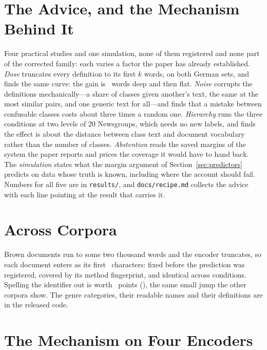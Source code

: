 \documentclass[11pt]{article}
\begin{document}


\section{The Advice, and the Mechanism Behind It}
\label{app:practice}

Four practical studies and one simulation, none of them registered and none part
of the corrected family: each varies a factor the paper has already established.
\emph{Dose} truncates every definition to its first $k$ words, on both German
sets, and finds the same curve: the gain is \DoseNinetyWords\ words deep and
then flat. \emph{Noise} corrupts the definitions mechanically---a share of
classes given another's text, the same at the most similar pairs, and one generic
text for all---and finds that a mistake between confusable classes costs about
three times a random one. \emph{Hierarchy} runs the three conditions at two
levels of 20 Newsgroups, which needs no new labels, and finds the effect is about
the distance between class text and document vocabulary rather than the number of
classes. \emph{Abstention} reads the saved margins of the system the paper
reports and prices the coverage it would have to hand back. The
\emph{simulation} states what the margin argument of
Section~\ref{sec:predictors} predicts on data whose truth is known, including
where the account should fail. Numbers for all five are in
\texttt{results/}, and \texttt{docs/recipe.md} collects the advice with each
line pointing at the result that carries it.

\section{Across Corpora}
\label{app:brown}







Brown documents run to some two thousand words and the encoder truncates, so
each document enters as its first \BrownTruncate\ characters: fixed before the
prediction was registered, covered by its method fingerprint, and identical
across conditions. Spelling the identifier out is worth
\BrownSpellGain~points (\BrownSpellPStat), the same small jump the other
corpora show. The genre categories, their readable names and their definitions
are in the released code.

\section{The Mechanism on Four Encoders}
\label{app:mechanism}
\end{document}
